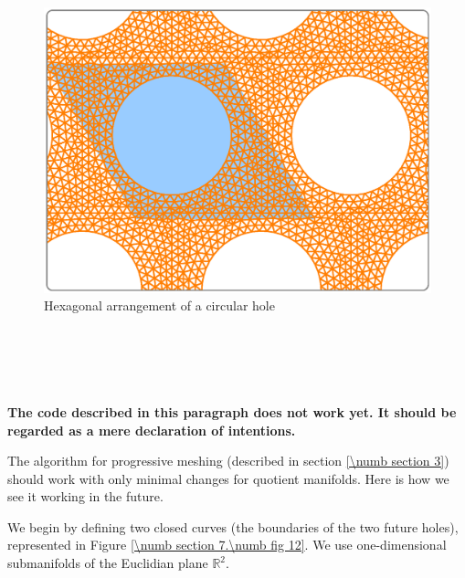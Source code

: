 \begin{figure}[ht] \centering
  \includegraphics[width=130mm]{hexa-round-hole.eps}
  \caption{Hexagonal arrangement of a circular hole}
  \label{\numb section 7.\numb fig 11}
\end{figure}


\section{~~}
\label{\numb section 7.\numb parag 17}

{\normalfont\bfseries The code described in this paragraph does not work yet.
It should be regarded as a mere declaration of intentions.}
\medskip


The algorithm for progressive meshing (described in section \ref{\numb section 3})
should work with only minimal changes for quotient manifolds.
Here is how we see it working in the future.

We begin by defining two closed curves (the boundaries of the two future holes),
represented in Figure \ref{\numb section 7.\numb fig 12}.
We use one-dimensional submanifolds of the Euclidian plane $ \mathbb{R}^2 $.


